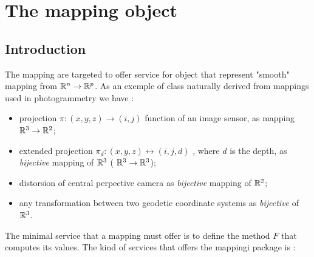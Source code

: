 

\chapter{The mapping object}


\section{Introduction}


The mapping  are targeted to offer service for object that represent "smooth" mapping
from $\mathbb{R}^n  \rightarrow  \mathbb{R}^p$. As an exemple of class naturally derived from mappings used
in photogrammetry we have :

\begin{itemize}
	\item projection $\pi : (x,y,z) \rightarrow (i,j)$ function of an image sensor, as mapping $\mathbb{R}^3 \rightarrow \mathbb{R}^2$;

	\item extended projection $\pi_d :  (x,y,z) \leftrightarrow (i,j,d)$ , where $d$ is  the depth,
		as \emph{bijective} mapping of $\mathbb{R}^3$  ( $\mathbb{R}^3 \rightarrow  \mathbb{R}^3$);

	\item distorsion of central perpective camera as  \emph{bijective} mapping of $\mathbb{R}^2$;

	\item any  transformation  between two geodetic coordinate systems as \emph{bijective}  of  $\mathbb{R}^3$.

\end{itemize}

The minimal service that a mapping must offer is to define the method $F$ that computes its values.
The kind of services that offers the  mappingi package is :

